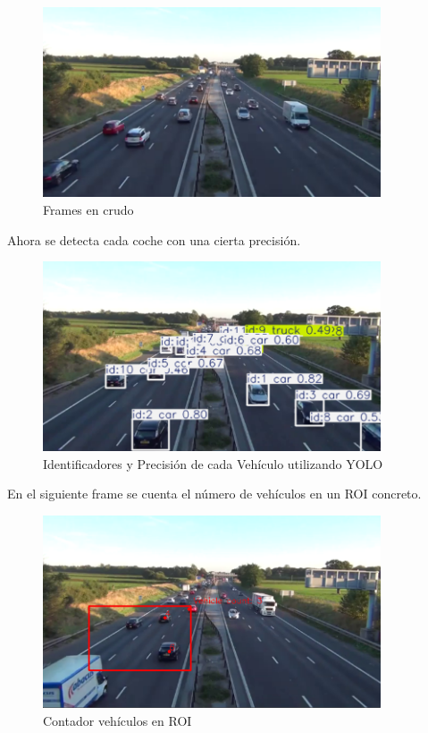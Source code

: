 \begin{figure}[H]
    \centering
    \includegraphics[width = 10cm]{ImagenesLatex/im1.jpg}{}
    \caption{Frames en crudo}
    \label{fig:enter-label}
\end{figure}

Ahora se detecta cada coche con una cierta precisión.
\begin{figure}[H]
    \centering
    \includegraphics[width = 10cm]{ImagenesLatex/im2.png}{}
    \caption{Identificadores y Precisión de cada Vehículo utilizando YOLO}
    \label{fig:enter-label}
\end{figure}
En el siguiente frame se cuenta el número de vehículos en un ROI concreto.
\begin{figure}[H]
    \centering
    \includegraphics[width = 10cm]{ImagenesLatex/im3.png}
    \caption{Contador vehículos en ROI}
    \label{fig:enter-label}
\end{figure}
